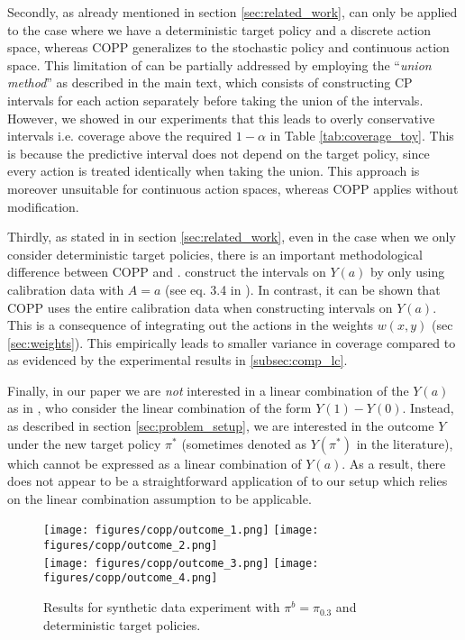 Secondly, as already mentioned in section \ref{sec:related_work}, \cite{lei2020conformal} can only be applied to the case where we have a deterministic target policy and a discrete action space, whereas COPP generalizes to the stochastic policy and continuous action space. This limitation of \cite{lei2020conformal} can be partially addressed by employing the ``\textit{union method}'' as described in the main text, which consists of constructing CP intervals for each action separately before taking the union of the intervals. However, we showed in our experiments that this leads to overly conservative intervals i.e. coverage above the required $1-\alpha$ in Table \ref{tab:coverage_toy}. This is because the predictive interval does not depend on the target policy, since every action is treated identically when taking the union. This approach is moreover unsuitable for continuous action spaces, whereas COPP applies without modification.

Thirdly, as stated in in section \ref{sec:related_work}, even in the case when we only consider deterministic target policies, there is an important methodological difference between COPP and \cite{lei2020conformal}. \cite{lei2020conformal} construct the intervals on $Y(a)$ by only using calibration data with $A=a$ (see eq. 3.4 in \cite{lei2020conformal}). In contrast, it can be shown that COPP uses the entire calibration data when constructing intervals on $Y(a)$. This is a consequence of integrating out the actions in the weights $w(x, y)$ (sec \ref{sec:weights}). This empirically leads to smaller variance in coverage compared to \cite{lei2020conformal} as evidenced by the experimental results in \ref{subsec:comp_lc}.

Finally, in our paper we are \emph{not} interested in a linear combination of the $Y(a)$ as in \cite{lei2020conformal}, who consider the linear combination of the form $Y(1)-Y(0)$. Instead, as described in section \ref{sec:problem_setup}, we are interested in the outcome $Y$ under the new target policy $\pi^*$ (sometimes denoted as $Y(\pi^*)$ in the literature), which cannot be expressed as a linear combination of $Y(a)$. As a result, there does not appear to be a straightforward application of \cite[Section 4.3]{lei2020conformal} to our setup which relies on the linear combination assumption to be applicable.

\begin{figure*}[t]
    \centering
    \texttt{[image: figures/copp/outcome\_1.png]}
    \texttt{[image: figures/copp/outcome\_2.png]}\\
    \texttt{[image: figures/copp/outcome\_3.png]}
    \texttt{[image: figures/copp/outcome\_4.png]}
    \caption{Results for synthetic data experiment with $\pi^b = \pi_{0.3}$ and deterministic target policies.}
    \label{fig:comp_lc}
\end{figure*}
